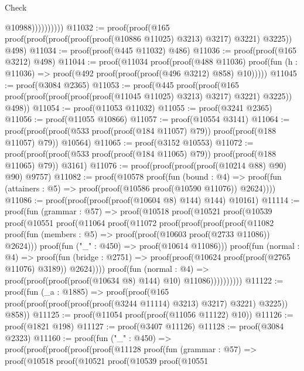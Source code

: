 \begin{lexlean}{Check}
\begin{coremodule}
                                      @10988))))))))))
@11032 := proof(proof(@165 proof(proof(proof(proof(proof(@10886 @11025) @3213) @3217) @3221) @3225))
      @498)
@11034 := proof(proof(@445 @11032) @486)
@11036 := proof(proof(@165 @3212) @498)
@11044 := proof(@11034
      proof(proof(@488 @11036)
          proof(fun (h : @11036) => proof(@492 proof(proof(proof(@496 @3212) @858) @10)))))
@11045 := proof(@3084 @2365)
@11053 := proof(@445
      proof(proof(@165 proof(proof(proof(proof(proof(@11045 @11025) @3213) @3217) @3221) @3225))
          @498))
@11054 := proof(@11053 @11032)
@11055 := proof(@3241 @2365)
@11056 := proof(@11055 @10866)
@11057 := proof(@10554 @3141)
@11064 := proof(proof(proof(@533 proof(proof(@184 @11057) @79)) proof(proof(@188 @11057) @79))
      @10564)
@11065 := proof(@3152 @10553)
@11072 := proof(proof(proof(@533 proof(proof(@184 @11065) @79)) proof(proof(@188 @11065) @79))
      @3161)
@11076 := proof(proof(proof(proof(@10214 @88) @90) @90) @9757)
@11082 := proof(@10578
      proof(fun (bound : @4) =>
        proof(fun (attainers : @5) => proof(proof(@10586 proof(@10590 @11076)) @2624))))
@11086 := proof(proof(proof(proof(@10604 @8) @144) @144) @10161)
@11114 := proof(fun (grammar : @57) =>
    proof(@10518
        proof(@10521
            proof(@10539
                proof(@10551
                    proof(@11064
                        proof(@11072
                            proof(proof(proof(proof(@11082
                                      proof(fun (members : @5) =>
                                        proof(proof(@10603 proof(@2733 @11086)) @2624)))
                                    proof(fun ("_" : @450) => proof(@10614 @11086)))
                                  proof(fun (normal : @4) =>
                                    proof(fun (bridge : @2751) =>
                                      proof(proof(@10624 proof(proof(@2765 @11076) @3189)) @2624))))
                                proof(fun (normal : @4) =>
                                  proof(proof(proof(proof(@10634 @8) @144) @10) @11086))))))))))
@11122 := proof(fun (_a : @1885) =>
    proof(proof(@165 proof(proof(proof(proof(proof(@3244 @11114) @3213) @3217) @3221) @3225)) @858))
@11125 := proof(@11054 proof(proof(@11056 @11122) @10))
@11126 := proof(@1821 @198)
@11127 := proof(@3407 @11126)
@11128 := proof(@3084 @2323)
@11160 := proof(fun ("_" : @450) =>
    proof(proof(proof(proof(proof(@11128
                proof(fun (grammar : @57) =>
                  proof(@10518
                      proof(@10521
                          proof(@10539
                              proof(@10551

\end{coremodule}
\end{lexlean}
